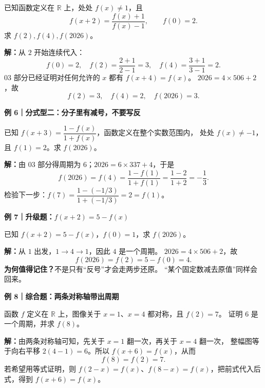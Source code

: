 \begin{examplebox}
已知函数定义在 $\mathbb R$ 上，处处 $f(x)\ne1$，且
\[
 f(x+2)=\frac{f(x)+1}{f(x)-1},\qquad f(0)=2.
\]
求 $f(2),f(4),f(2026)$。

\textbf{解：}从 $2$ 开始连续代入：
\[
 f(0)=2,\quad f(2)=\frac{2+1}{2-1}=3,\quad
 f(4)=\frac{3+1}{3-1}=2.
\]
03 部分已经证明对任何允许的 $x$ 都有 $f(x+4)=f(x)$。
$2026=4\times506+2$，故
\[
\boxed{f(2)=3,\quad f(4)=2,\quad f(2026)=3.}
\]


\end{examplebox}\clearpage\begin{examplebox}\textbf{例 6｜分式型二：分子里有减号，不要写反}



已知 $f(x+3)=\dfrac{1-f(x)}{1+f(x)}$，函数定义在整个实数范围内，
处处 $f(x)\ne-1$，且 $f(1)=2$。求 $f(2026)$。

\textbf{解：}由 03 部分得周期为 $6$；$2026=6\times337+4$，于是
\[
 f(2026)=f(4)=\frac{1-f(1)}{1+f(1)}
 =\frac{1-2}{1+2}=\boxed{-\frac13}.
\]
检验下一步：$f(7)=\dfrac{1-(-1/3)}{1+(-1/3)}=2=f(1)$。

\medskip
\end{examplebox}\clearpage\begin{examplebox}\textbf{例 7｜升级题：$f(x+2)=5-f(x)$}



已知 $f(x+2)=5-f(x)$，$f(0)=1$，求 $f(2026)$。

\textbf{解：}从 $1$ 出发，$1\to4\to1$，因此 $4$ 是一个周期。
$2026=4\times506+2$，故
\[f(2026)=f(2)=5-f(0)=\boxed4.\]
\textbf{为何值得记住？}不是只有“反号”才会走两步还原。
“某个固定数减去原值”同样会回来。

\medskip
\end{examplebox}\clearpage\begin{examplebox}\textbf{例 8｜综合题：两条对称轴带出周期}



函数 $f$ 定义在 $\mathbb R$ 上，图像关于 $x=1$、$x=4$ 都对称，且 $f(2)=7$。
证明 $6$ 是一个周期，并求 $f(8)$。

\textbf{解：}由两条对称轴可知，先关于 $x=1$ 翻一次，再关于 $x=4$ 翻一次，
整幅图等于向右平移 $2(4-1)=6$。所以 $f(x+6)=f(x)$，从而
\[\boxed{f(8)=f(2)=7}.\]
若希望用等式证明，则
$f(2-x)=f(x)$、$f(8-x)=f(x)$，把前式代入后式，得到 $f(x+6)=f(x)$。
\end{examplebox}
